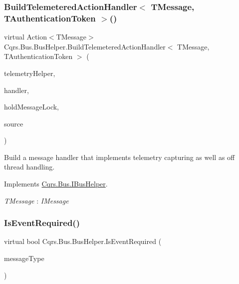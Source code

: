 \subsubsection{\texorpdfstring{Build\+Telemetered\+Action\+Handler$<$ T\+Message, T\+Authentication\+Token $>$()}{BuildTelemeteredActionHandler< TMessage, TAuthenticationToken >()}}
{\footnotesize\ttfamily virtual Action$<$T\+Message$>$ Cqrs.\+Bus.\+Bus\+Helper.\+Build\+Telemetered\+Action\+Handler$<$ T\+Message, T\+Authentication\+Token $>$ (\begin{DoxyParamCaption}\item[{I\+Telemetry\+Helper}]{telemetry\+Helper,  }\item[{Action$<$ T\+Message $>$}]{handler,  }\item[{bool}]{hold\+Message\+Lock,  }\item[{string}]{source }\end{DoxyParamCaption})\hspace{0.3cm}{\ttfamily [virtual]}}



Build a message handler that implements telemetry capturing as well as off thread handling. 



Implements \hyperlink{interfaceCqrs_1_1Bus_1_1IBusHelper_a29751c186da5e2b042067af6a1be6d5d}{Cqrs.\+Bus.\+I\+Bus\+Helper}.

\begin{Desc}
\item[Type Constraints]\begin{description}
\item[{\em T\+Message} : {\em I\+Message}]\end{description}
\end{Desc}
\mbox{\label{classCqrs_1_1Bus_1_1BusHelper_a28c675e976adbf348637ec6ff6410c1a}} 
\subsubsection{\texorpdfstring{Is\+Event\+Required()}{IsEventRequired()}\hspace{0.1cm}{\footnotesize\ttfamily [1/2]}}
{\footnotesize\ttfamily virtual bool Cqrs.\+Bus.\+Bus\+Helper.\+Is\+Event\+Required (\begin{DoxyParamCaption}\item[{Type}]{message\+Type }\end{DoxyParamCaption})\hspace{0.3cm}{\ttfamily [virtual]}}




